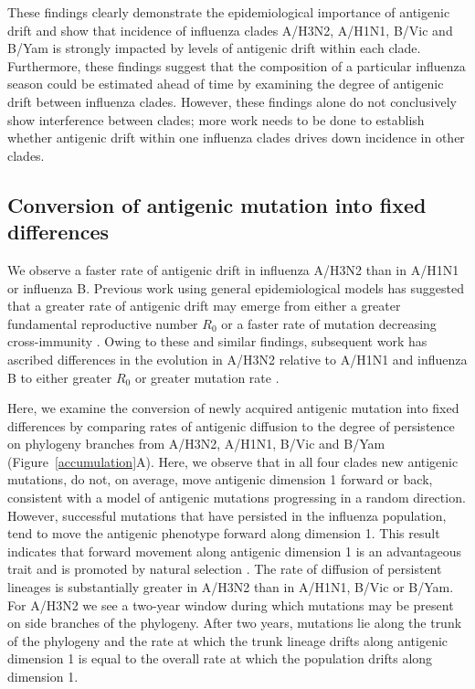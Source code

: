 \documentclass[11pt,oneside,letterpaper]{article}
\begin{document}
These findings clearly demonstrate the epidemiological importance of antigenic drift and show that incidence of influenza clades A/H3N2, A/H1N1, B/Vic and B/Yam is strongly impacted by levels of antigenic drift within each clade.
Furthermore, these findings suggest that the composition of a particular influenza season could be estimated ahead of time by examining the degree of antigenic drift between influenza clades.
However, these findings alone do not conclusively show interference between clades; more work needs to be done to establish whether antigenic drift within one influenza clades drives down incidence in other clades.

\subsection*{Conversion of antigenic mutation into fixed differences}

We observe a faster rate of antigenic drift in influenza A/H3N2 than in A/H1N1 or influenza B.
Previous work using general epidemiological models has suggested that a greater rate of antigenic drift may emerge from either a greater fundamental reproductive number $R_0$ or a faster rate of mutation decreasing cross-immunity \cite{Gog02,Lin03}.
Owing to these and similar findings, subsequent work has ascribed differences in the evolution in A/H3N2 relative to A/H1N1 and influenza B to either greater $R_0$ or greater mutation rate \cite{Ferguson03,Bedford12}.

Here, we examine the conversion of newly acquired antigenic mutation into fixed differences by comparing rates of antigenic diffusion to the degree of persistence on phylogeny branches from A/H3N2, A/H1N1, B/Vic and B/Yam (Figure~\ref{accumulation}A).
Here, we observe that in all four clades new antigenic mutations, do not, on average, move antigenic dimension 1 forward or back, consistent with a model of antigenic mutations progressing in a random direction.
However, successful mutations that have persisted in the influenza population, tend to move the antigenic phenotype forward along dimension 1.
This result indicates that forward movement along antigenic dimension 1 is an advantageous trait and is promoted by natural selection \cite{Bedford12}.
The rate of diffusion of persistent lineages is substantially greater in A/H3N2 than in A/H1N1, B/Vic or B/Yam.
For A/H3N2 we see a two-year window during which mutations may be present on side branches of the phylogeny.
After two years, mutations lie along the trunk of the phylogeny and the rate at which the trunk lineage drifts along antigenic dimension 1 is equal to the overall rate at which the population drifts along dimension 1.
\end{document}
